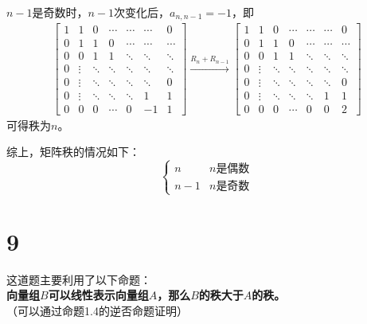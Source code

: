 \documentclass{article}
\begin{document}
$n - 1$是奇数时，$n - 1$次变化后，$a_{n, n - 1} = -1$，即
\begin{align*}
  \begin{bmatrix}
    1 & 1      & 0      & \cdots & \cdots & \cdots & 0      \\
    0 & 1      & 1      & 0      & \cdots & \cdots & \cdots \\
    0 & 0      & 1      & 1      & \ddots & \ddots & \ddots \\
    0 & \vdots & \ddots & \ddots & \ddots & \ddots & \ddots \\
    0 & \vdots & \ddots & \ddots & \ddots & \ddots & 0      \\
    0 & \vdots & \ddots & \ddots & \ddots & 1      & 1      \\
    0 & 0      & 0      & \cdots & 0      & -1     & 1
  \end{bmatrix}
  \xrightarrow{R_n + R_{n - 1}}
  \begin{bmatrix}
    1 & 1      & 0      & \cdots & \cdots & \cdots & 0      \\
    0 & 1      & 1      & 0      & \cdots & \cdots & \cdots \\
    0 & 0      & 1      & 1      & \ddots & \ddots & \ddots \\
    0 & \vdots & \ddots & \ddots & \ddots & \ddots & \ddots \\
    0 & \vdots & \ddots & \ddots & \ddots & \ddots & 0      \\
    0 & \vdots & \ddots & \ddots & \ddots & 1      & 1      \\
    0 & 0      & 0      & \cdots & 0      & 0      & 2
  \end{bmatrix}
\end{align*}
可得秩为$n$。

综上，矩阵秩的情况如下：
\begin{equation*}
  \begin{cases*}
    n     & n \text{是偶数} \\
    n - 1 & n \text{是奇数}
  \end{cases*}
\end{equation*}

\section*{9}
这道题主要利用了以下命题：\\
\textbf{向量组$B$可以线性表示向量组$A$，那么$B$的秩大于$A$的秩。} \\
（可以通过命题1.4的逆否命题证明）
\end{document}
